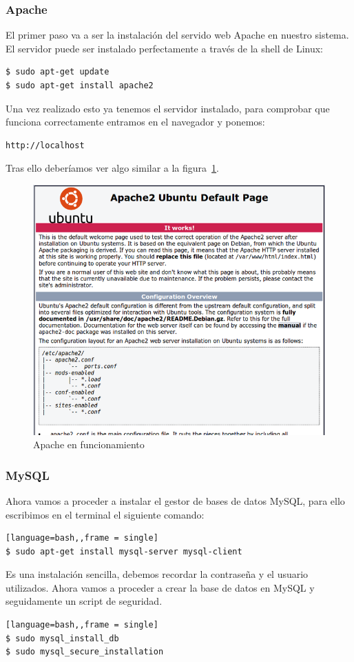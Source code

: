 \subsubsection{Apache}
El primer paso va a ser la instalación del servido web Apache en nuestro sistema. El servidor puede ser instalado perfectamente a través de la shell de Linux:
\begin{lstlisting}[language=bash,frame = single]
$ sudo apt-get update
$ sudo apt-get install apache2
\end{lstlisting}
Una vez realizado esto ya tenemos el servidor instalado, para comprobar que funciona correctamente entramos en el navegador y ponemos: 
\begin{lstlisting}[language=bash,]
http://localhost
\end{lstlisting}
Tras ello deberíamos ver algo similar a la figura~\ref{fig:Apache}.
\begin{figure}
\centering
\includegraphics[width=.9\textwidth]{img/apache}
\caption{Apache en funcionamiento}
\label{fig:Apache}
\end{figure}

\subsubsection{MySQL}
Ahora vamos a proceder a instalar el gestor de bases de datos MySQL, para ello   escribimos en el terminal el siguiente comando:
\begin{lstlisting}[language=bash,,frame = single]
$ sudo apt-get install mysql-server mysql-client
\end{lstlisting}
Es una instalación sencilla, debemos recordar la contraseña y el usuario utilizados.
Ahora vamos a proceder a crear la base de datos en MySQL y  seguidamente un script de seguridad.
\begin{lstlisting}[language=bash,,frame = single]
$ sudo mysql_install_db
$ sudo mysql_secure_installation
\end{lstlisting}
